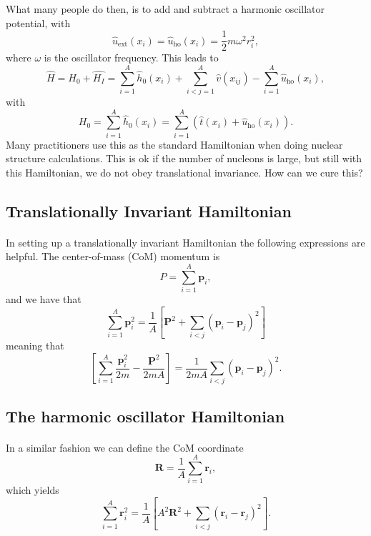 \documentclass[%
twoside,                 %
final,                   %
10pt]{article}
\begin{document}
What many people do then, is to add and subtract a harmonic oscillator potential,
with 
\[
\hat{u}_{\mathrm{ext}}(x_i)=\hat{u}_{\mathrm{ho}}(x_i)= \frac{1}{2}m\omega^2 r_i^2,
\]
where $\omega$ is the oscillator frequency. This leads to 
\[
    \hat{H} = \hat{H_0} + \hat{H_I} 
    = \sum_{i=1}^A \hat{h}_0(x_i) + \sum_{i < j=1}^A \hat{v}(x_{ij})-\sum_{i=1}^A\hat{u}_{\mathrm{ho}}(x_i),
\]
with 
\[
  H_0=\sum_{i=1}^A \hat{h}_0(x_i) =  \sum_{i=1}^A\left(\hat{t}(x_i) + \hat{u}_{\mathrm{ho}}(x_i)\right).
\]
Many practitioners use this as the standard Hamiltonian when doing nuclear structure calculations. 
This is ok if the number of nucleons is large, but still with this Hamiltonian, we do not obey translational invariance.  How can we cure this?



\subsection*{Translationally Invariant Hamiltonian}

\paragraph{}
 In setting up a translationally invariant Hamiltonian  
 the following expressions are helpful.
 The center-of-mass (CoM)  momentum is
\[
    P=\sum_{i=1}^A\bm{p}_i,
 \]
 and we have that
\[
 \sum_{i=1}^A\bm{p}_i^2 =
 \frac{1}{A}\left[\bm{P}^2+\sum_{i < j}(\bm{p}_i-\bm{p}_j)^2\right]
 \]
 meaning that
\[
 \left[\sum_{i=1}^A\frac{\bm{p}_i^2}{2m} -\frac{\bm{P}^2}{2mA}\right]
 =\frac{1}{2mA}\sum_{i < j}(\bm{p}_i-\bm{p}_j)^2.
 \]



\subsection*{The harmonic oscillator Hamiltonian}

\paragraph{}
 In a similar fashion we can define the CoM coordinate
\[
     \bm{R}=\frac{1}{A}\sum_{i=1}^{A}\bm{r}_i,
 \]
 which yields
 \[
 \sum_{i=1}^A\bm{r}_i^2 =
 \frac{1}{A}\left[A^2\bm{R}^2+\sum_{i < j}(\bm{r}_i-\bm{r}_j)^2\right].
 \]
\end{document}
